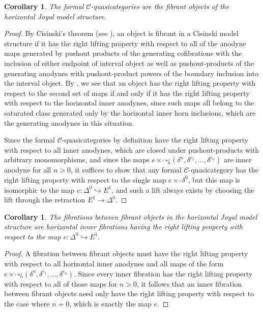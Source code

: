 \documentclass[a4paper]{article}
\numberwithin{equation}{subsection}
\theoremstyle{plain}   %
\newtheorem{cor}[equation]{Corollary}
\theoremstyle{definition}
\theoremstyle{remark}
\theoremstyle{plain}
\providecommand{\C}{}
\renewcommand{\C}{\ensuremath{\mathcal{C}}}
\begin{document}
\begin{cor}
	The formal \(\C\)-quasicategories are the fibrant objects of the horizontal Joyal model structure.
\end{cor}
\begin{proof}
	By Cisinski's theorem (see ), an object is fibrant in a Cisinski model structure if it has the right lifting property with respect to all of the anodyne maps generated by pushout products of the generating cofibrations with the inclusion of either endpoint of interval object as well as pushout-products of the generating anodynes with pushout-product powers of the boundary inclusion into the interval object.  By , we see that an object has the right lifting property with respect to the second set of maps if and only if it has the right lifting property with respect to the horizontal inner anodynes, since such maps all belong to the saturated class generated only by the horizontal inner horn inclusions, which are the generating anodynes in this situation. 
	
	Since the formal \(\C\)-quasicategories by definition have the right lifting property with respect to all inner anodynes, which are closed under pushout-products with arbitrary monomorphisms, and since the maps \(e\times^\lrcorner  \square_n^\lrcorner(\delta^n,\delta^{c_1},\dots,\delta^{c_n})\) are inner anodyne for all \(n>0\),  it suffices to show that any formal \(\C\)-quasicategory has the right lifting property with respect to the single map \(e\times^\lrcorner \delta^0\), but this map is isomorphic to the map \(e:\Delta^0 \hookrightarrow E^1\), and such a lift always exists by choosing the lift through the retraction \(E^1\to \Delta^0\).
\end{proof}
\begin{cor}
	The fibrations between fibrant objects in the horizontal Joyal model structure are horizontal inner fibrations having the right lifting property with respect to the map \(e:\Delta^0\hookrightarrow E^1\).
\end{cor}
\begin{proof} 
	A fibration between fibrant objects must have the right lifting property with respect to all horizontal inner anodynes and all maps of the form \(e\times^\lrcorner  \square_n^\lrcorner(\delta^n,\delta^{c_1},\dots,\delta^{c_n})\).  Since every inner fibration has the right lifting property with respect to all of those maps for \(n>0\), it follows that an inner fibration between fibrant objects need only have the right lifting property with respect to the case where \(n=0\), which is exactly the map \(e\).
\end{proof}
\end{document}
